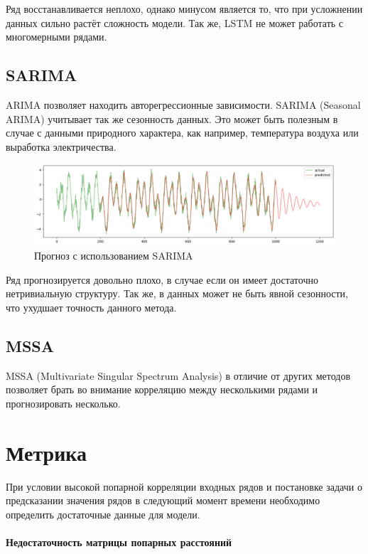 \documentclass{article}
\begin{document}
Ряд восстанавливается неплохо, однако минусом является то, что при усложнении данных сильно растёт сложность модели. Так же, LSTM не может работать с многомерными рядами.

\subsection{SARIMA}

ARIMA позволяет находить авторегрессионные зависимости. SARIMA (Seasonal ARIMA) учитывает так же сезонность данных. Это может быть полезным в случае с данными природного характера, как например, температура воздуха или выработка электричества.

\begin{figure}
	\centering
	\includegraphics[width=\textwidth]{SARIMA-prediction.png}
	\caption{Прогноз с использованием SARIMA}
	\label{fig:fig2}
\end{figure}

Ряд прогнозируется довольно плохо, в случае если он имеет достаточно нетривиальную структуру. Так же, в данных может не быть явной сезонности, что ухудшает точность данного метода.

\subsection{MSSA}

MSSA (Multivariate Singular Spectrum Analysis) в отличие от других методов позволяет брать во внимание корреляцию между несколькими рядами и прогнозировать несколько.

\section{Метрика}

При условии высокой попарной корреляции входных рядов и постановке задачи о предсказании значения рядов в следующий момент времени необходимо определить достаточные данные для модели.

\paragraph{Недостаточность матрицы попарных расстояний}
\end{document}
